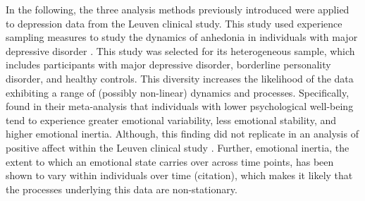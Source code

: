 In the following, the three analysis methods previously introduced were applied
to depression data from the Leuven clinical study. This study used experience
sampling measures to study the dynamics of anhedonia in individuals with major
depressive disorder \parencite{heininga_dynamical_2019}. This study was
selected for its heterogeneous sample, which includes participants with major
depressive disorder, borderline personality disorder, and healthy controls.
This diversity increases the likelihood of the data exhibiting a range of
(possibly non-linear) dynamics and processes. Specifically,
\textcite{houben_relation_2015} found in their meta-analysis that individuals
with lower psychological well-being tend to experience greater emotional
variability, less emotional stability, and higher emotional inertia. Although,
this finding did not replicate in an analysis of positive affect within the
Leuven clinical study \parencite{heininga_dynamical_2019}. Further, emotional
inertia, the extent to which an emotional state carries over across time
points, has been shown to vary within individuals over time (citation), which
makes it likely that the processes underlying this data are non-stationary.